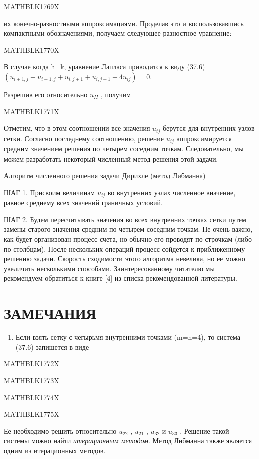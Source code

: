 \documentclass[
]{article}
\providecommand{\tightlist}{%
  \setlength{\itemsep}{0pt}\setlength{\parskip}{0pt}}
\begin{document}
MATHBLK1769X

их конечно-разностными аппроксимациями. Проделав это и воспользовавшись
компактными обозначениями, получаем следующее разностное уравнение:

MATHBLK1770X

В случае когда h=k, уравнение Лапласа приводится к виду (37.6)
\((u_{i+1,j}+u_{i-1,j}+u_{i,j+1}+u_{i,j+1}-4u_{ij})=0.\)

Разрешив его относительно \(u_{II}\) , получим

MATHBLK1771X

Отметим, что в этом соотношении все значения \(u_{tj}\) берутся для
внутренних узлов сетки. Согласно последнему соотношению, решение
\(u_{ij}\) аппроксимируется средним значением решения по четырем
соседним точкам. Следовательно, мы можем разработать некоторый численный
метод решения этой задачи.

Алгоритм численного решения задачи Дирихле (метод Либманна)

ШАГ 1. Присвоим величинам \(u_{ij}\) во внутренних узлах численное
вначение, равное среднему всех значений граничных условий.

ШАГ 2. Будем пересчитывать значения во всех внутренних точках сетки
путем замены старого значения средним по четырем соседним точкам. Не
очень важно, как будет организован процесс счета, но обычно его проводят
по строчкам (либо по столбцам). После нескольких операций процесс
сойдется к приближенному решению задачи. Скорость сходимости этого
алгоритма невелика, но ее можно увеличить несколькими способами.
Заинтересованному читателю мы рекомендуем обратиться к книге {[}4{]} из
списка рекомендованной литературы.

\section{ЗАМЕЧАНИЯ}\label{ux437ux430ux43cux435ux447ux430ux43dux438ux44f-4}

\begin{enumerate}
\def\labelenumi{\arabic{enumi}.}
\tightlist
\item
  Если взять сетку с чегырьмя внутренними точками (m=n=4), то система
  (37.6) запишется в виде
\end{enumerate}

MATHBLK1772X

MATHBLK1773X

MATHBLK1774X

MATHBLK1775X

Ее необходимо решить относительно \(u_{22}\) , \(u_{21}\) , \(u_{32}\) и
\(u_{33}\) . Решение такой системы можно найти \emph{итерационным
методом}. Метод Либманна также является одним из итерационных методов.
\end{document}
